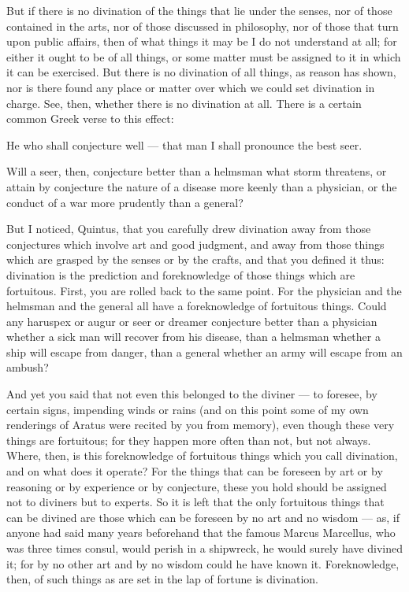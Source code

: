  But if there is no divination of the things that lie under the senses, nor of those contained in the arts, nor of those discussed in philosophy, nor of those that turn upon public affairs, then of what things it may be I do not understand at all; for either it ought to be of all things, or some matter must be assigned to it in which it can be exercised. But there is no divination of all things, as reason has shown, nor is there found any place or matter over which we could set divination in charge. See, then, whether there is no divination at all. There is a certain common Greek verse to this effect:

He who shall conjecture well — that man I shall pronounce the best seer.

Will a seer, then, conjecture better than a helmsman what storm threatens, or attain by conjecture the nature of a disease more keenly than a physician, or the conduct of a war more prudently than a general?

 But I noticed, Quintus, that you carefully drew divination away from those conjectures which involve art and good judgment, and away from those things which are grasped by the senses or by the crafts, and that you defined it thus: divination is the prediction and foreknowledge of those things which are fortuitous. First, you are rolled back to the same point. For the physician and the helmsman and the general all have a foreknowledge of fortuitous things. Could any haruspex or augur or seer or dreamer conjecture better than a physician whether a sick man will recover from his disease, than a helmsman whether a ship will escape from danger, than a general whether an army will escape from an ambush?

 And yet you said that not even this belonged to the diviner — to foresee, by certain signs, impending winds or rains (and on this point some of my own renderings of Aratus were recited by you from memory), even though these very things are fortuitous; for they happen more often than not, but not always. Where, then, is this foreknowledge of fortuitous things which you call divination, and on what does it operate? For the things that can be foreseen by art or by reasoning or by experience or by conjecture, these you hold should be assigned not to diviners but to experts. So it is left that the only fortuitous things that can be divined are those which can be foreseen by no art and no wisdom — as, if anyone had said many years beforehand that the famous Marcus Marcellus, who was three times consul, would perish in a shipwreck, he would surely have divined it; for by no other art and by no wisdom could he have known it. Foreknowledge, then, of such things as are set in the lap of fortune is divination.

